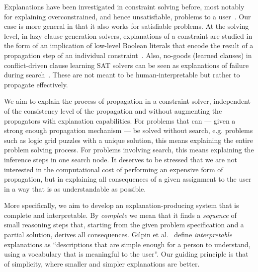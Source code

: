 Explanations have been investigated in constraint solving before, most notably for explaining overconstrained, and hence unsatisfiable, problems to a user~\cite{junker2001quickxplain}.
Our case is more general in that it also works for satisfiable problems.
At the solving level, in lazy clause generation solvers, explanations of a constraint are studied in the form of an implication of low-level Boolean literals that encode the result of a propagation step of an individual constraint~\cite{feydy2009lazy}. 
Also, no-goods (learned clauses) in conflict-driven clause learning SAT solvers can be seen as explanations of failure during search~\cite{marques2009conflict}. 
These are not meant to be human-interpretable but rather to propagate effectively.

We aim to explain the process of propagation in a constraint solver, independent of the consistency level of the propagation and without augmenting the propagators with explanation capabilities.
For problems that can --- given a strong enough propagation mechanism --- be solved without search, e.g. problems such as logic grid puzzles with a unique solution, this means explaining the entire problem solving process. 
For problems involving search, this means explaining the inference steps  in one search node. 
It deserves to be stressed that we are not interested in the computational cost of performing an expensive form of propagation, but in explaining all consequences of a given assignment to the user in a way that is as understandable as possible. 

More specifically, we aim to develop an explanation-producing system that is complete and interpretable. 
By \emph{complete} we mean that it finds a \emph{sequence} of small reasoning steps that, starting from the given problem specification and a partial solution, derives all consequences. 
Gilpin et al.~\cite{DBLP:conf/dsaa/GilpinBYBSK18} define \emph{interpretable} explanations as ``descriptions that are simple enough for a person to understand, using a vocabulary that is meaningful to the user''. 
Our guiding principle is that of simplicity, where smaller and simpler explanations are better. 

